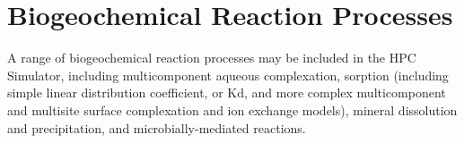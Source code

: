 %
%

\section{Biogeochemical Reaction Processes} 
\label{sec:biogeochemical}

A range of biogeochemical reaction processes may be included in the HPC Simulator, 
including multicomponent aqueous complexation, sorption (including simple linear distribution coefficient, or Kd, 
and more complex multicomponent and multisite surface complexation and ion exchange models), 
mineral dissolution and precipitation, and microbially-mediated reactions.  















